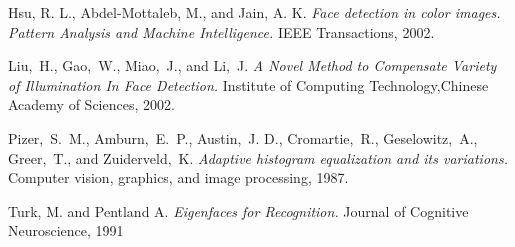 \documentclass[conference]{IEEEtran}
\begin{document}
\begin{thebibliography}{1}

Hsu, R. L., Abdel-Mottaleb, M., and Jain, A. K. \emph{Face detection in color images. Pattern Analysis and Machine Intelligence.} IEEE Transactions, 2002.

Liu,~H., Gao,~W., Miao,~J., and Li,~J. \emph{A Novel Method to Compensate Variety of Illumination In Face Detection.} Institute of Computing Technology,Chinese Academy of Sciences, 2002.

Pizer,~S.~M., Amburn,~E.~P., Austin,~J. D., Cromartie,~R., Geselowitz,~A., Greer,~T., and Zuiderveld,~K. \emph{Adaptive histogram equalization and its variations.} Computer vision, graphics, and image processing, 1987.

Turk, M. and Pentland A. \emph{Eigenfaces for Recognition.} Journal of Cognitive Neuroscience, 1991

\end{thebibliography}

\end{document}
